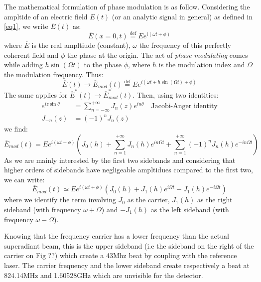 \documentclass[12pt]{report}
\begin{document}
The mathematical formulation of phase modulation is as follow. Considering the ampltide of an electric field $E(t)$ (or an analytic signal in general) as defined in \eqref{eq1}, we write $\overline{E}(t)$ as:
\begin{equation}
\overline{E}(x=0, t) \stackrel{\text{def}}{=} Ee^{i(\omega t + \phi)}
\end{equation}
where $\overline{E}$ is the real ampltiude (constant), $\omega$ the frequency of this perfectly coherent field and $\phi$ the phase at the origin. The act of \textit{phase modulating} comes while adding $h\sin(\Omega t)$ to the phase $\phi$, where $h$ is the modulation index and $\Omega$ the modulation frequency. Thus:
\begin{equation}
\overline{E}(t) \rightarrow \overline{E}_{mod}(t) \stackrel{\text{def}}{=} Ee^{i(\omega t + h\sin(\Omega t) + \phi)}
\end{equation}
The same applies for $\overline{E}^*(t) \rightarrow \overline{E}^*_{mod}(t)$. Then, using two identities:
\begin{align}
e^{iz\sin\theta} &= \sum_{n=-\infty}^{+\infty} J_n(z)e^{in\theta} \quad \textrm{Jacobi-Anger identity}\\
J_{-n}(z) &= (-1)^nJ_n(z)
\end{align}
we find:
\begin{equation}
\overline{E}_{mod}(t) = Ee^{i(\omega t + \phi)} \left( J_0(h) + \sum_{n=1}^{+\infty} J_n(h)e^{in\Omega t} + \sum_{n=1}^{+\infty} (-1)^n J_n(h)e^{-in\Omega t} \right)
\end{equation}
As we are mainly interested by the first two sidebands and considering that higher orders of sidebands have negligeable ampltidues compared to the first two, we can write:
\begin{equation}
\overline{E}_{mod}(t) \simeq Ee^{i(\omega t + \phi)} \left( J_0(h) + J_1(h)e^{i\Omega t} - J_1(h)e^{-i\Omega t} \right)
\end{equation}
where we identify the term involving $J_0$ as the carrier, $J_1(h)$ as the right sideband (with frequency $\omega + \Omega$) and $-J_1(h)$ as the left sideband (with frequency $\omega - \Omega$).

Knowing that the frequency carrier has a lower frequency than the actual superadiant beam, this is the upper sideband (i.e the sideband on the right of the carrier on Fig ??) which create a 43Mhz beat by coupling with the reference laser. The carrier frequency and the lower sideband create respectively a beat at 824.14MHz and 1.60528GHz which are unvisible for the detector.
\end{document}
